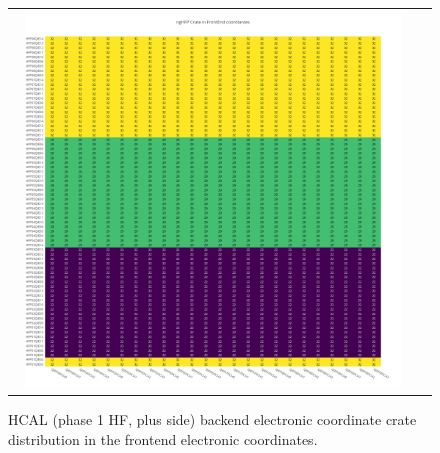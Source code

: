 \begin{figure}[htb]
 \begin{center}
  \begin{tabular}{cc}
   \includegraphics[angle=0,width=0.95\textwidth]{figures/appendix/ngHFP_Crate_in_FrontEnd.png}
  \end{tabular}
  \caption{HCAL (phase 1 HF, plus side) backend electronic coordinate crate distribution in the frontend electronic coordinates.}
  \label{fig:lmapngHFPCrateFEC}
 \end{center}
\end{figure}
\clearpage


